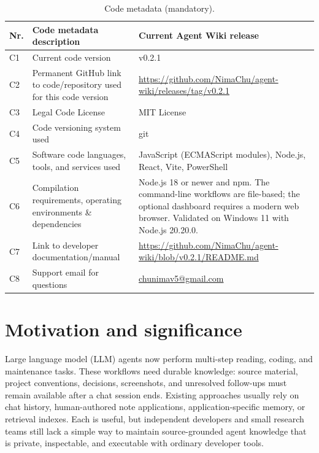\documentclass[preprint,12pt,a4paper]{elsarticle}
\begin{document}
\begin{table}[!h]
\small
\begin{tabular}{|p{0.7cm}|p{5.1cm}|p{7.2cm}|}
\hline
\textbf{Nr.} & \textbf{Code metadata description} & \textbf{Current Agent Wiki release} \\
\hline
C1 & Current code version & v0.2.1 \\
\hline
C2 & Permanent GitHub link to code/repository used for this code version &
\url{https://github.com/NimaChu/agent-wiki/releases/tag/v0.2.1} \\
\hline
C3 & Legal Code License & MIT License \\
\hline
C4 & Code versioning system used & git \\
\hline
C5 & Software code languages, tools, and services used &
JavaScript (ECMAScript modules), Node.js, React, Vite, PowerShell \\
\hline
C6 & Compilation requirements, operating environments \& dependencies &
Node.js 18 or newer and npm. The command-line workflows are file-based; the
optional dashboard requires a modern web browser. Validated on Windows 11 with
Node.js 20.20.0. \\
\hline
C7 & Link to developer documentation/manual &
\url{https://github.com/NimaChu/agent-wiki/blob/v0.2.1/README.md} \\
\hline
C8 & Support email for questions & \href{mailto:chunimav5@gmail.com}{chunimav5@gmail.com} \\
\hline
\end{tabular}
\caption{Code metadata (mandatory).}
\label{tab:code-metadata}
\end{table}

\section{Motivation and significance}

Large language model (LLM) agents now perform multi-step reading, coding, and
maintenance tasks. These workflows need durable knowledge: source material,
project conventions, decisions, screenshots, and unresolved follow-ups must
remain available after a chat session ends. Existing approaches usually rely
on chat history, human-authored note applications, application-specific memory,
or retrieval indexes. Each is useful, but independent developers and small
research teams still lack a simple way to maintain source-grounded agent
knowledge that is private, inspectable, and executable with ordinary developer
tools.
\end{document}
